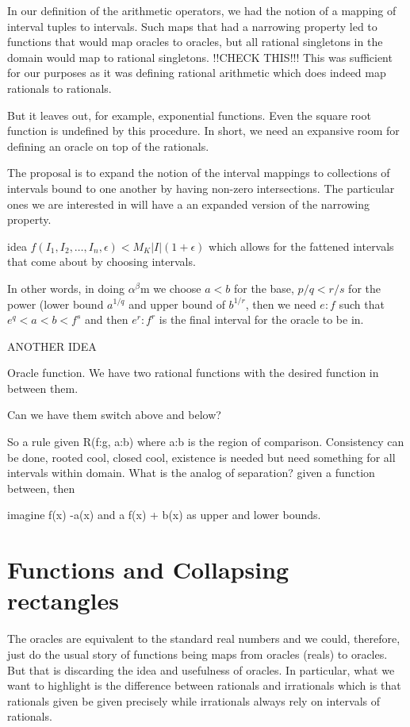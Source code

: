 \documentclass[12pt]{article}
\theoremstyle{remark}
\begin{document}
In our definition of the arithmetic operators, we had the notion of a mapping of interval tuples to intervals. Such maps that had a narrowing property led to functions that would map oracles to oracles, but all rational singletons in the domain would map to rational singletons. !!CHECK THIS!!! This was sufficient for our purposes as it was defining rational arithmetic which does indeed map rationals to rationals. 

But it leaves out, for example, exponential functions. Even the square root function is undefined by this procedure. In short, we need an expansive room for defining an oracle on top of the rationals. 

The proposal is to expand the notion of the interval mappings to collections of intervals bound to one another by having non-zero intersections. The particular ones we are interested in will have a an expanded version of the narrowing property. 

idea $f(I_1, I_2, \ldots, I_n, \epsilon) < M_K |I|(1+\epsilon)$ which allows for the fattened intervals that come about by choosing intervals. 

In other words,  in doing $\alpha^\beta$m we choose $a<b$ for the base, $p/q<r/s$ for the power (lower bound $a^{1/q}$ and upper bound of $b^{1/r}$, then we need $e:f$ such that $e^q < a < b < f^s$ and then $e^r:f^r$ is the final interval for the oracle to be in. 

ANOTHER IDEA

Oracle function.  We have two rational functions with the desired function in between them. 

Can we have them switch above and below? 

So a rule given R(f:g, a:b) where a:b is the region of comparison. Consistency can be done, rooted cool, closed cool, existence is needed but need something for all intervals within domain. What is the analog of separation? given a function between, then

imagine f(x) -a(x) and a f(x) + b(x) as upper and lower bounds. 


\section{Functions and Collapsing rectangles}

The oracles are equivalent to the standard real numbers and we could, therefore, just do the usual story of functions being maps from oracles (reals) to oracles. But that is discarding the idea and usefulness of oracles. In particular, what we want to highlight is the difference between rationals and irrationals which is that rationals given be given precisely while irrationals always rely on intervals of rationals. 
\end{document}
